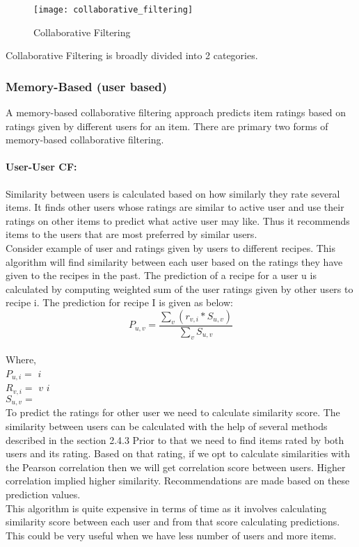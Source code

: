 \begin{figure}[H]
	\centering
	\texttt{[image: collaborative\_filtering]}
	\caption{Collaborative Filtering \cite{cf_figures}}
	\label{fig:collaborative_filtering}
\end{figure}


Collaborative Filtering is broadly divided into 2 categories. 
\\
\subsubsection{Memory-Based (user based)}
A memory-based collaborative filtering approach predicts item ratings based on ratings given by different users for an item. There are primary two forms of memory-based collaborative filtering.
\paragraph{User-User CF:} 
Similarity between users is calculated based on how similarly they rate several items. It finds other users whose ratings are similar to active user and use their ratings on other items to predict what active user may like. Thus it recommends items to the users that are most preferred by similar users.
\\
Consider example of user and ratings given by users to different recipes. This algorithm will find similarity between each user based on the ratings they have given to the recipes in the past. The prediction of a recipe for a user u is calculated by computing weighted sum of the user ratings given by other users to recipe i.
The prediction for recipe I is given as below:
\\
\begin{equation}
P_{u,v} = \frac { \sum_v(r_{v,i} * S_{u,v})}{\sum_v S_{u,v}}
\end{equation}
\\
Where, 
\\
\noindent
$P_{u,i} = $  $i$ 
\\
$R_{v,i} = $  $v$  $i$ 
\\
$S_{u,v} = $ 
\\

\noindent To predict the ratings for other user we need to calculate similarity score. The similarity between users can be calculated with the help of several methods described in the section 2.4.3 Prior to that we need to find items rated by both users and its rating. Based on that rating, if we opt to calculate similarities with the Pearson correlation then we will get correlation score between users. Higher correlation implied higher similarity. Recommendations are made based on these prediction values. 
\\
This algorithm is quite expensive in terms of time as it involves calculating similarity score between each user and from that score calculating predictions. This could be very useful when we have less number of users and more items. 
